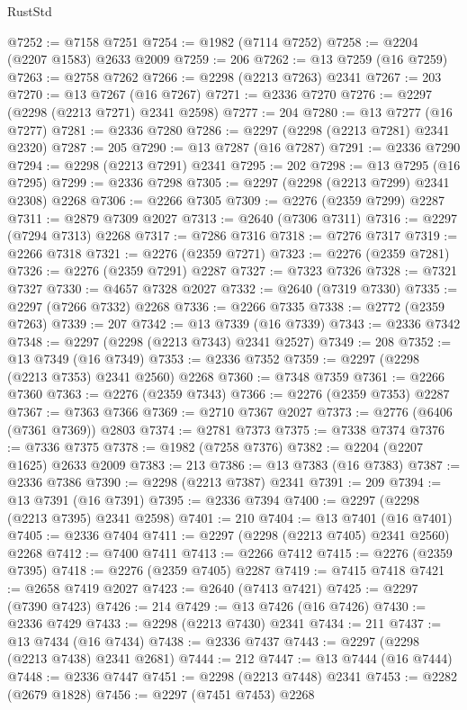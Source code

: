 \begin{lexlean}{RustStd}
\begin{coremodule}
@7252 := @7158 @7251
@7254 := @1982 (@7114 @7252)
@7258 := @2204 (@2207 @1583) @2633 @2009
@7259 := 206
@7262 := @13 @7259 (@16 @7259)
@7263 := @2758 @7262
@7266 := @2298 (@2213 @7263) @2341
@7267 := 203
@7270 := @13 @7267 (@16 @7267)
@7271 := @2336 @7270
@7276 := @2297 (@2298 (@2213 @7271) @2341 @2598)
@7277 := 204
@7280 := @13 @7277 (@16 @7277)
@7281 := @2336 @7280
@7286 := @2297 (@2298 (@2213 @7281) @2341 @2320)
@7287 := 205
@7290 := @13 @7287 (@16 @7287)
@7291 := @2336 @7290
@7294 := @2298 (@2213 @7291) @2341
@7295 := 202
@7298 := @13 @7295 (@16 @7295)
@7299 := @2336 @7298
@7305 := @2297 (@2298 (@2213 @7299) @2341 @2308) @2268
@7306 := @2266 @7305
@7309 := @2276 (@2359 @7299) @2287
@7311 := @2879 @7309 @2027
@7313 := @2640 (@7306 @7311)
@7316 := @2297 (@7294 @7313) @2268
@7317 := @7286 @7316
@7318 := @7276 @7317
@7319 := @2266 @7318
@7321 := @2276 (@2359 @7271)
@7323 := @2276 (@2359 @7281)
@7326 := @2276 (@2359 @7291) @2287
@7327 := @7323 @7326
@7328 := @7321 @7327
@7330 := @4657 @7328 @2027
@7332 := @2640 (@7319 @7330)
@7335 := @2297 (@7266 @7332) @2268
@7336 := @2266 @7335
@7338 := @2772 (@2359 @7263)
@7339 := 207
@7342 := @13 @7339 (@16 @7339)
@7343 := @2336 @7342
@7348 := @2297 (@2298 (@2213 @7343) @2341 @2527)
@7349 := 208
@7352 := @13 @7349 (@16 @7349)
@7353 := @2336 @7352
@7359 := @2297 (@2298 (@2213 @7353) @2341 @2560) @2268
@7360 := @7348 @7359
@7361 := @2266 @7360
@7363 := @2276 (@2359 @7343)
@7366 := @2276 (@2359 @7353) @2287
@7367 := @7363 @7366
@7369 := @2710 @7367 @2027
@7373 := @2776 (@6406 (@7361 @7369)) @2803
@7374 := @2781 @7373
@7375 := @7338 @7374
@7376 := @7336 @7375
@7378 := @1982 (@7258 @7376)
@7382 := @2204 (@2207 @1625) @2633 @2009
@7383 := 213
@7386 := @13 @7383 (@16 @7383)
@7387 := @2336 @7386
@7390 := @2298 (@2213 @7387) @2341
@7391 := 209
@7394 := @13 @7391 (@16 @7391)
@7395 := @2336 @7394
@7400 := @2297 (@2298 (@2213 @7395) @2341 @2598)
@7401 := 210
@7404 := @13 @7401 (@16 @7401)
@7405 := @2336 @7404
@7411 := @2297 (@2298 (@2213 @7405) @2341 @2560) @2268
@7412 := @7400 @7411
@7413 := @2266 @7412
@7415 := @2276 (@2359 @7395)
@7418 := @2276 (@2359 @7405) @2287
@7419 := @7415 @7418
@7421 := @2658 @7419 @2027
@7423 := @2640 (@7413 @7421)
@7425 := @2297 (@7390 @7423)
@7426 := 214
@7429 := @13 @7426 (@16 @7426)
@7430 := @2336 @7429
@7433 := @2298 (@2213 @7430) @2341
@7434 := 211
@7437 := @13 @7434 (@16 @7434)
@7438 := @2336 @7437
@7443 := @2297 (@2298 (@2213 @7438) @2341 @2681)
@7444 := 212
@7447 := @13 @7444 (@16 @7444)
@7448 := @2336 @7447
@7451 := @2298 (@2213 @7448) @2341
@7453 := @2282 (@2679 @1828)
@7456 := @2297 (@7451 @7453) @2268

\end{coremodule}
\end{lexlean}
